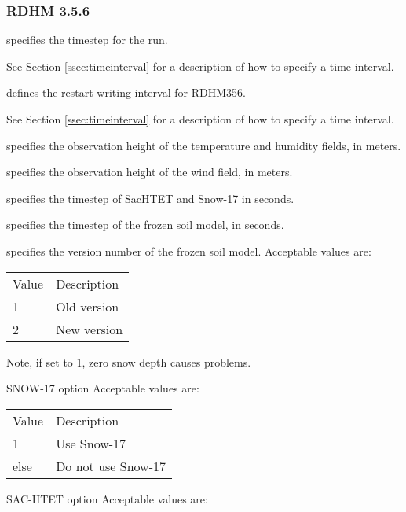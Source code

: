  
 \subsubsection{RDHM 3.5.6} \label{sssec:lsm_rdhm356}
 

 
  specifies the timestep for the run.

 See Section \ref{ssec:timeinterval} for a description
 of how to specify a time interval.

  defines the restart
 writing interval for RDHM356.

 See Section \ref{ssec:timeinterval} for a description
 of how to specify a time interval.

  specifies the observation height of
 the temperature and humidity fields, in meters.

  specifies the observation height of
 the wind field, in meters.

  specifies the timestep
 of SacHTET and Snow-17 in seconds.

  specifies the timestep of the frozen
 soil model, in seconds.

  specifies the version number of
 the frozen soil model.
 Acceptable values are:

 \begin{tabular}{ll}
 Value & Description \\
 1     & Old version \\
 2     & New version \\
 \end{tabular}

 Note, if set to 1, zero snow depth causes problems.

  SNOW-17 option
 Acceptable values are:

 \begin{tabular}{ll}
 Value & Description        \\
 1     & Use Snow-17        \\
 else  & Do not use Snow-17 \\
 \end{tabular}

  SAC-HTET option
 Acceptable values are:

